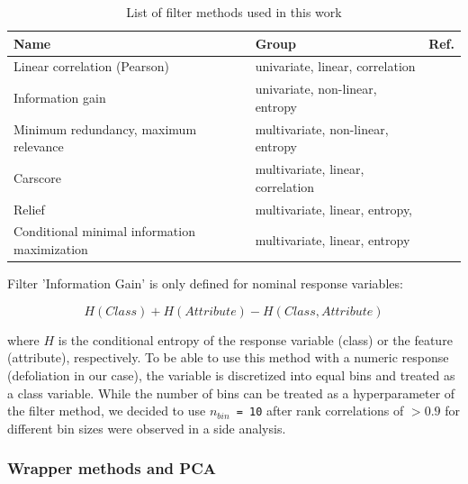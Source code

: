 \documentclass[letterpaper, peerreview]{IEEEtran}
\begin{document}
\begin{table}[b!]
\centering
\caption[t]{List of filter methods used in this work}
\begingroup\footnotesize
\begin{adjustbox}{width={0.48\textwidth},totalheight={\textheight},keepaspectratio}
	\begin{tabular}{lll}
		\\
		Name                                         & Group                             & Ref.               \\
		\toprule
		Linear correlation (Pearson)                 & univariate, linear, correlation   & \cite{pearson1901} \\
		Information gain                             & univariate, non-linear, entropy   & \cite{quinlan1986} \\
		Minimum redundancy, maximum relevance        & multivariate, non-linear, entropy & \cite{zhao2013}    \\
		Carscore                                     & multivariate, linear, correlation & \cite{zuber2011}   \\
		Relief                                       & multivariate, linear, entropy,    & \cite{kira1992}    \\
		Conditional minimal information maximization & multivariate, linear, entropy     & \cite{fleuret2004}
	\end{tabular}
\end{adjustbox}
\endgroup\label{tab:filter-methods}
\end{table}

\noindent Filter 'Information Gain' is only defined for nominal response variables:

\begin{equation}
	H(Class) + H(Attribute) - H(Class, Attribute)
\end{equation}

where \(H\) is the conditional entropy of the response variable (class) or the feature (attribute), respectively.
To be able to use this method with a numeric response (defoliation in our case), the variable is discretized into equal bins and treated as a class variable.
While the number of bins can be treated as a hyperparameter of the filter method, we decided to use \texttt{\(n_{bin}\) = 10} after rank correlations of $> 0.9$ for different bin sizes were observed in a side analysis.

\subsubsection{Wrapper methods and PCA}
\end{document}
